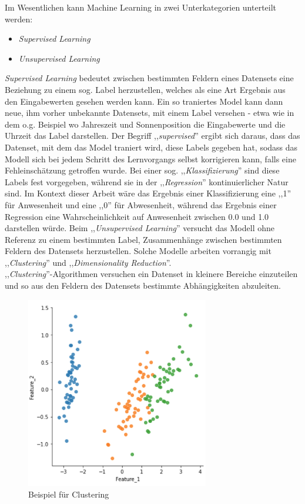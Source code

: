 Im Wesentlichen kann Machine Learning in zwei Unterkategorien unterteilt werden:
\begin{itemize}
    \item \textit{Supervised Learning} 
    \item \textit{Unsupervised Learning}
\end{itemize}
\textit{Supervised Learning} bedeutet zwischen bestimmten Feldern eines Datensets eine Beziehung
zu einem sog. Label herzustellen, welches als eine Art Ergebnis aus den Eingabewerten gesehen 
werden kann. Ein so traniertes Model kann dann neue, ihm vorher unbekannte Datensets, mit einem 
Label versehen - etwa wie in dem o.g. Beispiel wo Jahreszeit und Sonnenposition die Eingabewerte 
und die Uhrzeit das Label darstellen. Der Begriff ,,\textit{supervised}'' ergibt sich daraus, dass 
das Datenset, mit dem das Model traniert wird, diese Labels gegeben 
hat, sodass das Modell sich bei jedem Schritt des Lernvorgangs selbst korrigieren kann, falls 
eine Fehleinschätzung getroffen wurde.
Bei einer sog. ,,\textit{Klassifizierung}'' sind diese Labels fest vorgegeben, während sie in der 
,,\textit{Regression}'' kontinuierlicher Natur sind. Im Kontext dieser Arbeit wäre das Ergebnis einer 
Klassifizierung eine ,,1'' für Anwesenheit und eine ,,0'' für Abwesenheit, während das Ergebnis einer 
Regression eine Wahrscheinlichkeit auf Anwesenheit zwischen 0.0 und 1.0 darstellen würde.
\newline\newline
Beim ,,\textit{Unsupervised Learning}'' versucht das Modell ohne Referenz zu einem bestimmten 
Label, Zusammenhänge zwischen bestimmten Feldern des Datensets herzustellen. Solche Modelle 
arbeiten vorrangig mit ,,\textit{Clustering}'' und ,,\textit{Dimensionality Reduction}''.\\
,,\textit{Clustering}''-Algorithmen versuchen ein Datenset in kleinere Bereiche einzuteilen und
so aus den Feldern des Datensets bestimmte Abhängigkeiten abzuleiten.
\begin{figure}[h]
    \centering
    \includegraphics[width=8.0cm]{./pic/Clustering_Beispiel.png}
    \caption{Beispiel für Clustering}
    \label{fig:Clustering_Beispiel}
\end{figure}

